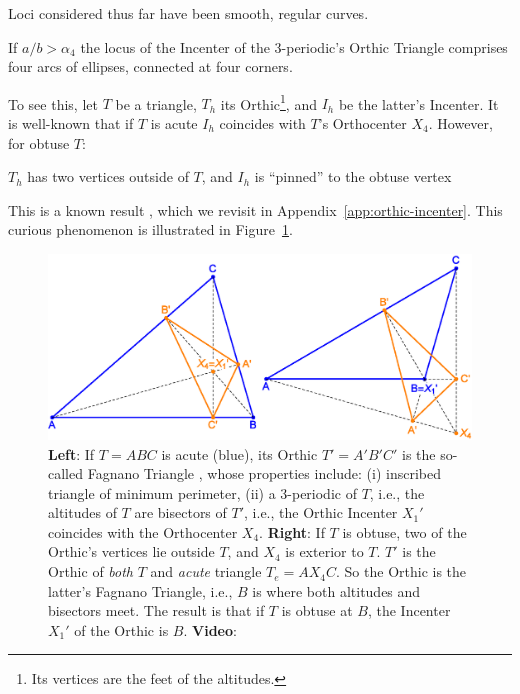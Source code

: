 Loci considered thus far have been smooth, regular curves.

\begin{proposition}
If $a/b>\alpha_4$ the locus of the Incenter of the 3-periodic's Orthic Triangle comprises four arcs of ellipses, connected at four corners.
\end{proposition}

To see this, let $T$ be a triangle, $T_h$ its Orthic\footnote{Its vertices are the feet of the altitudes.}, and $I_h$ be the latter's Incenter. It is well-known that if $T$ is acute $I_h$ coincides with $T$'s Orthocenter $X_4$. However, for obtuse $T$:

\begin{lemma}
$T_h$ has two vertices outside of $T$, and $I_h$ is ``pinned'' to the obtuse vertex
\label{lem:pinned}
\end{lemma}

This is a known result  \cite[Chapter 1]{coxeter67}, which we revisit in Appendix~\ref{app:orthic-incenter}. This curious phenomenon is illustrated in Figure~\ref{fig:orthic-incenter}. 

\begin{figure}
    \centering
    \includegraphics[width=.8\textwidth]{pics/1020_orthic_incenter.eps}
    \caption{\textbf{Left}: If $T=ABC$ is acute (blue), its Orthic $T'=A'B'C'$ is the so-called Fagnano Triangle \cite{rozikov2018-billiards}, whose properties include: (i) inscribed triangle of minimum perimeter, (ii) a 3-periodic of $T$, i.e., the altitudes of $T$ are bisectors of $T'$, i.e., the Orthic Incenter $X_1'$ coincides with the Orthocenter $X_4$. \textbf{Right}: If $T$ is obtuse, two of the Orthic's vertices lie outside $T$, and $X_4$ is exterior to $T$. $T'$ is the Orthic of {\em both} $T$ and {\em acute} triangle $T_e=A{X_4}C$. So the Orthic is the latter's Fagnano Triangle, i.e., $B$ is where both altitudes and bisectors meet. The result is that if $T$ is obtuse at $B$, the Incenter $X_1'$ of the Orthic is $B$. \textbf{Video}: \cite[PL\#06]{reznik2020-playlist-intriguing}}
    \label{fig:orthic-incenter}
\end{figure}


